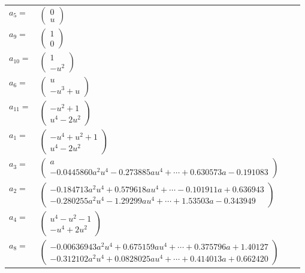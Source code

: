 \documentclass[1p]{elsarticle_modified}
\theoremstyle{definition}
\begin{document}
\begin{tabular}{m{7pt} m{180pt} m{7pt} m{180pt} }
\flushright $a_{5}=$&$\begin{pmatrix}0\\u\end{pmatrix}$ \\
\flushright $a_{9}=$&$\begin{pmatrix}1\\0\end{pmatrix}$ \\
\flushright $a_{10}=$&$\begin{pmatrix}1\\- u^2\end{pmatrix}$ \\
\flushright $a_{6}=$&$\begin{pmatrix}u\\- u^3+u\end{pmatrix}$ \\
\flushright $a_{11}=$&$\begin{pmatrix}- u^2+1\\u^4-2 u^2\end{pmatrix}$ \\
\flushright $a_{1}=$&$\begin{pmatrix}- u^4+u^2+1\\u^4-2 u^2\end{pmatrix}$ \\
\flushright $a_{3}=$&$\begin{pmatrix}a\\-0.0445860 a^{2} u^{4}-0.273885 a u^{4}+\cdots+0.630573 a-0.191083\end{pmatrix}$ \\
\flushright $a_{2}=$&$\begin{pmatrix}-0.184713 a^{2} u^{4}+0.579618 a u^{4}+\cdots-0.101911 a+0.636943\\-0.280255 a^{2} u^{4}-1.29299 a u^{4}+\cdots+1.53503 a-0.343949\end{pmatrix}$ \\
\flushright $a_{4}=$&$\begin{pmatrix}u^4- u^2-1\\- u^4+2 u^2\end{pmatrix}$ \\
\flushright $a_{8}=$&$\begin{pmatrix}-0.00636943 a^{2} u^{4}+0.675159 a u^{4}+\cdots+0.375796 a+1.40127\\-0.312102 a^{2} u^{4}+0.0828025 a u^{4}+\cdots+0.414013 a+0.662420\end{pmatrix}$ \\

\end{tabular}
\end{document}
